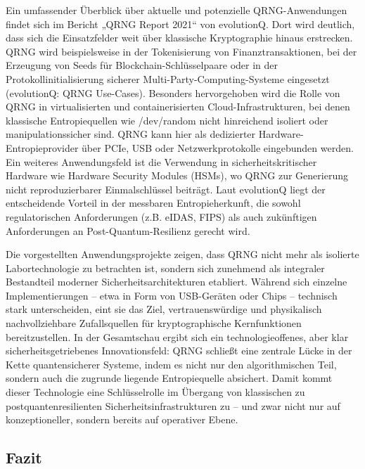 Ein umfassender Überblick über aktuelle und potenzielle QRNG-Anwendungen findet sich im Bericht „QRNG Report 2021“ von evolutionQ. Dort wird deutlich, dass sich die Einsatzfelder weit über klassische Kryptographie hinaus erstrecken. QRNG wird beispielsweise in der Tokenisierung von Finanztransaktionen, bei der Erzeugung von Seeds für Blockchain-Schlüsselpaare oder in der Protokollinitialisierung sicherer Multi-Party-Computing-Systeme eingesetzt (evolutionQ: QRNG Use-Cases). Besonders hervorgehoben wird die Rolle von QRNG in virtualisierten und containerisierten Cloud-Infrastrukturen, bei denen klassische Entropiequellen wie /dev/random nicht hinreichend isoliert oder manipulationssicher sind. QRNG kann hier als dedizierter Hardware-Entropieprovider über PCIe, USB oder Netzwerkprotokolle eingebunden werden. Ein weiteres Anwendungsfeld ist die Verwendung in sicherheitskritischer Hardware wie Hardware Security Modules (HSMs), wo QRNG zur Generierung nicht reproduzierbarer Einmalschlüssel beiträgt. Laut evolutionQ liegt der entscheidende Vorteil in der messbaren Entropieherkunft, die sowohl regulatorischen Anforderungen (z.B. eIDAS, FIPS) als auch zukünftigen Anforderungen an Post-Quantum-Resilienz gerecht wird.

Die vorgestellten Anwendungsprojekte zeigen, dass QRNG nicht mehr als isolierte Labortechnologie zu betrachten ist, sondern sich zunehmend als integraler Bestandteil moderner Sicherheitsarchitekturen etabliert. Während sich einzelne Implementierungen – etwa in Form von USB-Geräten oder Chips – technisch stark unterscheiden, eint sie das Ziel, vertrauenswürdige und physikalisch nachvollziehbare Zufallsquellen für kryptographische Kernfunktionen bereitzustellen. In der Gesamtschau ergibt sich ein technologieoffenes, aber klar sicherheitsgetriebenes Innovationsfeld: QRNG schließt eine zentrale Lücke in der Kette quantensicherer Systeme, indem es nicht nur den algorithmischen Teil, sondern auch die zugrunde liegende Entropiequelle absichert. Damit kommt dieser Technologie eine Schlüsselrolle im Übergang von klassischen zu postquantenresilienten Sicherheitsinfrastrukturen zu – und zwar nicht nur auf konzeptioneller, sondern bereits auf operativer Ebene.

\subsection{Fazit}




\printbibliography
